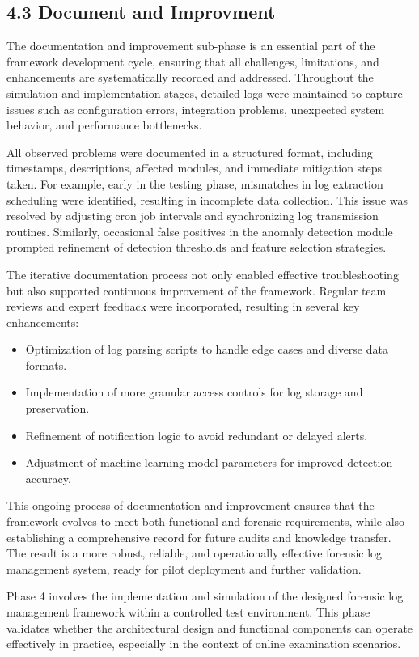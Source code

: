 \subsection{4.3 Document and Improvment}
The documentation and improvement sub-phase is an essential part of the framework development cycle, ensuring that all challenges, limitations, and enhancements are systematically recorded and addressed. Throughout the simulation and implementation stages, detailed logs were maintained to capture issues such as configuration errors, integration problems, unexpected system behavior, and performance bottlenecks.

All observed problems were documented in a structured format, including timestamps, descriptions, affected modules, and immediate mitigation steps taken. For example, early in the testing phase, mismatches in log extraction scheduling were identified, resulting in incomplete data collection. This issue was resolved by adjusting cron job intervals and synchronizing log transmission routines. Similarly, occasional false positives in the anomaly detection module prompted refinement of detection thresholds and feature selection strategies.

The iterative documentation process not only enabled effective troubleshooting but also supported continuous improvement of the framework. Regular team reviews and expert feedback were incorporated, resulting in several key enhancements:
\begin{itemize}
	\item Optimization of log parsing scripts to handle edge cases and diverse data formats.
	\item Implementation of more granular access controls for log storage and preservation.
	\item Refinement of notification logic to avoid redundant or delayed alerts.
	\item Adjustment of machine learning model parameters for improved detection accuracy.
\end{itemize}

This ongoing process of documentation and improvement ensures that the framework evolves to meet both functional and forensic requirements, while also establishing a comprehensive record for future audits and knowledge transfer. The result is a more robust, reliable, and operationally effective forensic log management system, ready for pilot deployment and further validation.

Phase 4 involves the implementation and simulation of the designed forensic log management framework within a controlled test environment. This phase validates whether the architectural design and functional components can operate effectively in practice, especially in the context of online examination scenarios.

